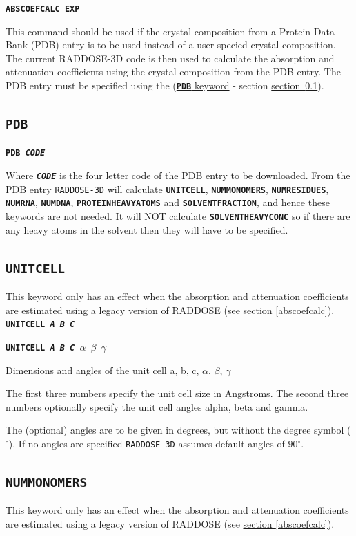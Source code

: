 \documentclass[a4paper]{article}
\newcommand{\RD}{\texttt{RADDOSE-3D}\xspace}
\newcommand{\Keyword}[1]{\texttt{\textbf{#1}}\xspace}
\newcommand{\SB}{\\[0.2em]}
\newcommand{\RDLegacyKeyword}{This keyword only has an effect when the absorption and attenuation coefficients are estimated using a legacy version of RADDOSE (see \hyperref[abscoefcalc]{section \ref*{abscoefcalc}}).\SB
}
\begin{document}
\noindent \Keyword{ABSCOEFCALC EXP}

This command should be used if the crystal composition from a Protein Data Bank (PDB) entry is to be used instead of a user specied crystal composition. The current RADDOSE-3D code is then used to calculate the absorption and attenuation coefficients using the crystal composition from the PDB entry. The PDB entry must be specified using the (\hyperref[pdb]{\Keyword{PDB} keyword} - section \hyperref[pdb]{section~\ref*{pdb}}).\SB

\subsection{\Keyword{PDB}}
\label{pdb}

\noindent \Keyword{PDB \textit{CODE}} 

Where \Keyword{\textit{CODE}} is the four letter code of the PDB entry to be downloaded. From the PDB entry \RD will calculate
 \hyperref[unitcell]{\Keyword{UNITCELL}},
 \hyperref[nummonomers]{\Keyword{NUMMONOMERS}},
 \hyperref[numresidues]{\Keyword{NUMRESIDUES}},
 \hyperref[numrna]{\Keyword{NUMRNA}},
 \hyperref[numdna]{\Keyword{NUMDNA}},
 \hyperref[proteinheavyatoms]{\Keyword{PROTEINHEAVYATOMS}} and
 \hyperref[solventfraction]{\Keyword{SOLVENTFRACTION}}, and hence these keywords are not needed. 
It will NOT calculate \hyperref[solventheavyconc]{\Keyword{SOLVENTHEAVYCONC}} so if there are any heavy atoms in the solvent then they will have to be specified.

\subsection{\Keyword{UNITCELL}}
\label{RDv3Start}
\label{unitcell}
\RDLegacyKeyword

\noindent \Keyword{UNITCELL \textit{A B C}}

\noindent \Keyword{UNITCELL \textit{A B C $\alpha$ $\beta$ $\gamma$}}

Dimensions and angles of the unit cell a, b, c, $\alpha$, $\beta$, $\gamma$

The first three numbers specify the unit cell size in Angstroms. The second three numbers optionally specify the unit cell angles alpha, beta and gamma.

The (optional) angles are to be given in degrees, but without the degree symbol ($^\circ$). If no angles are specified \RD assumes default angles of $90^\circ$.

\subsection{\Keyword{NUMMONOMERS}}
\label{nummonomers}
\RDLegacyKeyword
\end{document}
